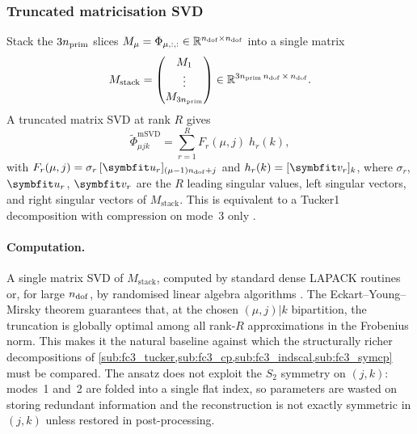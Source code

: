 \subsubsection{Truncated matricisation SVD}
\label{sub:fc3_matsvd}
Stack the $3n_{\mathrm{prim}}$ slices $M_\mu = \Phi_{\mu,:,:}\in\mathbb{R}^{n_{\mathrm{dof}}\times n_{\mathrm{dof}}}$
into a single matrix
\begin{equation}\label{eq:fc3_matsvd_stack}
  M_{\mathrm{stack}}
  = \begin{pmatrix} M_1 \\ \vdots \\ M_{3n_{\mathrm{prim}}} \end{pmatrix}
  \in \mathbb{R}^{3n_{\mathrm{prim}}\,n_{\mathrm{dof}} \,\times\, n_{\mathrm{dof}}}.
\end{equation}
A truncated matrix SVD at rank $R$ gives
\begin{equation}\label{eq:fc3_matsvd_ansatz}
    \tilde\Phi_{\mu j k}^{\mathrm{mSVD}}
    = \sum_{r=1}^{R} F_r(\mu,j)\; h_r(k),
\end{equation}
with $F_r(\mu,j) = \sigma_r\,[\vc{u}_r]_{(\mu-1)\ndof+j}$ and $h_r(k)=[\vc{v}_r]_k$, where
$\sigma_r$, $\vc{u}_r$, $\vc{v}_r$ are the $R$ leading singular values, left singular vectors,
and right singular vectors of $M_{\mathrm{stack}}$. This is equivalent to a Tucker1 decomposition
with compression on mode~3 only \cite[\S4]{kolda_tensor_2009}.

\paragraph{Computation.} A single matrix SVD of $M_{\mathrm{stack}}$, computed by
standard dense LAPACK routines or, for large $n_{\mathrm{dof}}$, by randomised linear algebra algorithms
\cite{halko_finding_2011}. The Eckart--Young--Mirsky theorem
\cite{eckart_approximation_1936, mirsky_symmetric_1960} guarantees that, at the chosen $(\mu,j)|k$ bipartition,
the truncation is globally optimal among all rank-$R$ approximations in the Frobenius norm.
This makes it the natural baseline against which the structurally richer decompositions of
\cref{sub:fc3_tucker,sub:fc3_cp,sub:fc3_indscal,sub:fc3_symcp} must be compared. The ansatz does
not exploit the $S_2$ symmetry on $(j,k)$: modes~1 and~2 are folded into a single flat index, so
parameters are wasted on storing redundant information and the reconstruction is not exactly
symmetric in $(j,k)$ unless restored in post-processing.

